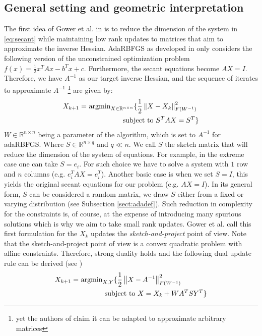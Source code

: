\documentclass[12pt,conference,compsocconf]{IEEEtran}
\newcommand\norm[1]{\left\lVert#1\right\rVert}
\newcommand{\R}{\mathbb{R}}
\begin{document}
\subsection{General setting and geometric interpretation}\label{sect:framework}
The first idea of Gower et al. in \cite{Gower1,Gower2} is to reduce the dimension of the system in \eqref{eq:secant} while maintaining low rank updates to matrices that aim to approximate the inverse Hessian. AdaRBFGS as developed in \cite{Gower1} only considers the following version of the unconstrained optimization problem $f(x)=\frac{1}{2}x^TAx -b^Tx + c$. Furthermore, the secant equations become $AX=I$.  Therefore, we have $A^{-1}$ as our target inverse Hessian, and the sequence of iterates to approximate $A^{-1}$ \footnote{yet the authors of \cite{Gower1} claim it can be adapted to approximate arbitrary matrices} are given by:
\begin{align}\label{eq:sketchandproject}
X_{k+1} = &\text{ argmin}_{X \in \R^{n\times n}} \{\frac{1}{2}\norm{X-X_k}_{F(W^{-1})}^2 \\ \nonumber
&\hspace{18mm}\text{subject to } S^TAX=S^T\} \nonumber
\end{align}
 $W \in \R^{n\times n}$ being a parameter of the algorithm, which is set to $A^{-1}$ for adaRBFGS. Where $S \in \R^{n\times q}$ and $q \ll n$. We call $S$ the sketch matrix that will reduce the dimension of the system of equations. For example, in the extreme case one can take $S=e_i$. For such choice we have to solve a system with $1$ row and $n$ columns (e.g. $e_i^TAX=e_i^T$). Another basic case is when we set $S=I$, this yields the original secant equations for our problem (e.g. $AX=I$). In its general form, $S$ can be considered a random matrix, we draw $S$ either from a fixed or varying distribution (see Subsection \ref{sect:adadef}). Such reduction in complexity for the constraints is, of course, at the expense of introducing many spurious solutions which is why we aim to take small rank updates. Gower et al. call this first formulation for the $X_k$ updates the \textit{sketch-and-project} point of view. Note that the sketch-and-project point of view is a convex quadratic problem with affine constraints. Therefore, strong duality holds and the following dual update rule can be derived (see \cite{Gower1})
 \begin{align}\label{eq:constrainandapprox}
 X_{k+1} = &\text{ argmin}_{X,Y} \{\frac{1}{2}\norm{X-A^{-1}}_{F(W^{-1})}^2\\ \nonumber
 &\hspace{13mm}\text{subject to } X=X_k + WA^TSY^T\}
 \end{align}
 
\end{document}
